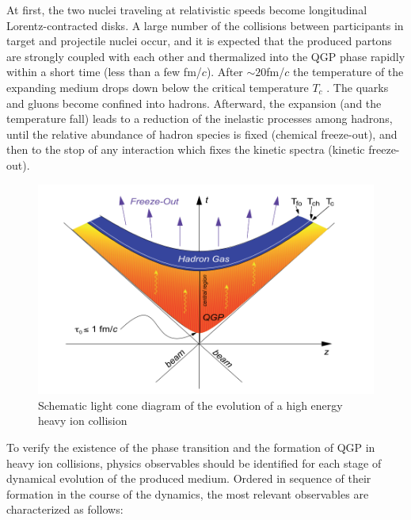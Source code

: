  	At first, the two nuclei traveling at relativistic speeds become longitudinal Lorentz-contracted disks. A large number of the collisions between participants in target and projectile nuclei occur, and it is expected that the produced partons are strongly coupled with each other and thermalized into the QGP phase rapidly within a short time (less than a few fm/$c$). After $\sim 20$fm/$c$ the temperature of the expanding medium drops down below the critical temperature $T_c$ \cite{Rapp2011}. The quarks and gluons become confined into hadrons.  Afterward, the expansion (and the temperature fall) leads to a reduction of the inelastic processes among hadrons, until the relative abundance of hadron species is fixed (chemical freeze-out), and then to the stop of any interaction which fixes the kinetic spectra (kinetic freeze-out).
 	
 
\begin{figure}[h]
\centerline{\includegraphics[width=13.0cm]{figures/system_evol}}
\caption{Schematic light cone diagram of the evolution of a high energy
heavy ion collision}
\label{fig2}
\end{figure}

	To verify the existence of the phase transition and the formation of QGP in heavy ion collisions, physics observables should be identified for each stage of dynamical evolution of the produced medium. Ordered in sequence of their formation in the course of the dynamics, the most relevant observables are characterized as follows:
	
